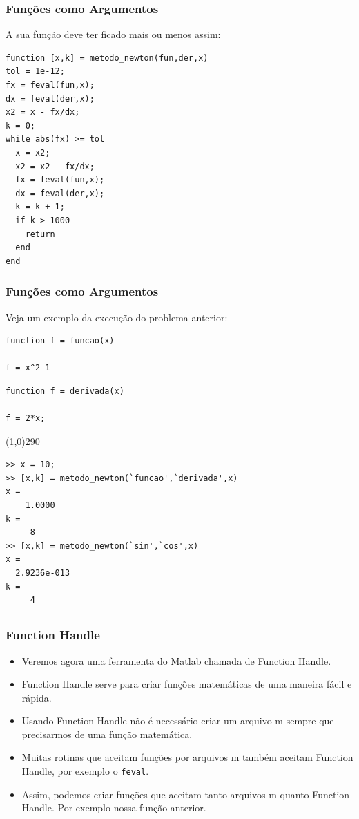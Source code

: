 \documentclass{beamer}
\newcommand{\ssiz}{\scriptsize}
\newcommand{\delim}{\line(1,0){290}}
\begin{document}
\begin{frame}[fragile]
\frametitle {Fun\c{c}\~oes como Argumentos}
A sua fun\c{c}\~ao deve ter ficado mais ou menos assim:
\pause

{\ssiz
\begin{verbatim}
function [x,k] = metodo_newton(fun,der,x)
tol = 1e-12;
fx = feval(fun,x);
dx = feval(der,x);
x2 = x - fx/dx;
k = 0;
while abs(fx) >= tol
  x = x2;
  x2 = x2 - fx/dx;
  fx = feval(fun,x);
  dx = feval(der,x);
  k = k + 1;
  if k > 1000
    return
  end
end\end{verbatim}
}

\end{frame}

\begin{frame}[fragile]
\frametitle{Fun\c{c}\~oes como Argumentos}

Veja um exemplo da execu\c{c}\~ao do problema anterior:

{\ssiz
\begin{multicols}{2}
\begin{verbatim}
function f = funcao(x)

f = x^2-1
\end{verbatim}
\begin{verbatim}
function f = derivada(x)

f = 2*x;
\end{verbatim}
\end{multicols}

\pause
\delim

\begin{verbatim}
>> x = 10;
>> [x,k] = metodo_newton(`funcao',`derivada',x)
x =
    1.0000
k =
     8
>> [x,k] = metodo_newton(`sin',`cos',x)
x = 
  2.9236e-013
k =
     4
\end{verbatim}
}
\end{frame}

\subsection[Function Handle]{}

\begin{frame}
\frametitle{Function Handle}

\begin{itemize}
 \item<1-> Veremos agora uma ferramenta do Matlab chamada de Function Handle.
 \item<2-> Function Handle serve para criar fun\c{c}\~oes matem\'aticas de uma maneira f\'acil e r\'apida.
 \item<3-> Usando Function Handle n\~ao \'e necess\'ario criar um arquivo m sempre que precisarmos de uma fun\c{c}\~ao matem\'atica.
 \item<4-> Muitas rotinas que aceitam fun\c{c}\~oes por arquivos m tamb\'em aceitam Function Handle, por exemplo o {\tt feval}.
 \item<5-> Assim, podemos criar fun\c{c}\~oes que aceitam tanto arquivos m quanto Function Handle. Por exemplo nossa fun\c{c}\~ao anterior.
\end{itemize}
\end{frame}
\end{document}
